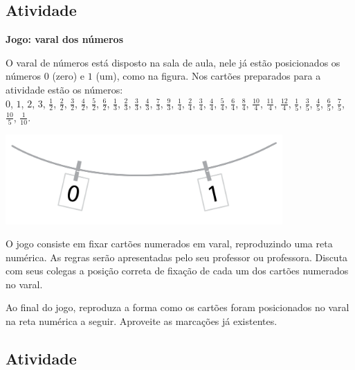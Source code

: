 \subsection{Atividade}

{\bf Jogo: varal dos números}

O varal de números está disposto na sala de aula, nele já estão posicionados os números $0$ (zero) e $1$ (um), como na figura. Nos cartões preparados para a atividade estão os números: \\
$0$, $1$, $2$, $3$, $\frac{1}{2}$, $\frac{2}{2}$, $\frac{3}{2}$, $\frac{4}{2}$, $\frac{5}{2}$, $\frac{6}{2}$,
$\frac{1}{3}$, $\frac{2}{3}$, $\frac{3}{3}$, $\frac{4}{3}$, $\frac{7}{3}$, $\frac{9}{3}$,
$\frac{1}{4}$, $\frac{2}{4}$, $\frac{3}{4}$, $\frac{4}{4}$, $\frac{5}{4}$, $\frac{6}{4}$, $\frac{8}{4}$, $\frac{10}{4}$, $\frac{11}{4}$, $\frac{12}{4}$,
$\frac{1}{5}$, $\frac{3}{5}$, $\frac{4}{5}$, $\frac{6}{5}$, $\frac{7}{5}$, $\frac{10}{5}$,
$\frac{1}{10}$.

\begin{center}
\includegraphics[width=300pt, keepaspectratio]{../figuras/licao03/ativ11_fig01.png}
\end{center}


O jogo consiste em fixar cartões numerados em varal, reproduzindo uma reta numérica. As regras serão apresentadas pelo seu professor ou professora. Discuta com seus colegas a posição correta de fixação de cada um dos cartões numerados no varal.

Ao final do jogo, reproduza a forma como os cartões foram posicionados no varal na reta numérica a seguir. Aproveite as marcações já existentes.

\begin{center}
\end{center}

\subsection{Atividade}

